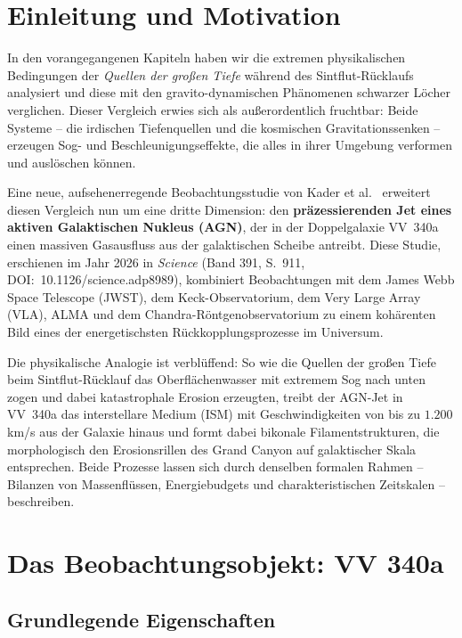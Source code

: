 ﻿\documentclass[12pt,a4paper]{report}
\begin{document}
\section{Einleitung und Motivation}

In den vorangegangenen Kapiteln haben wir die extremen physikalischen Bedingungen der \textit{Quellen der großen Tiefe} während des Sintflut-Rücklaufs analysiert und diese mit den gravito-dynamischen Phänomenen schwarzer Löcher verglichen. Dieser Vergleich erwies sich als außerordentlich fruchtbar: Beide Systeme -- die irdischen Tiefenquellen und die kosmischen Gravitationssenken -- erzeugen Sog- und Beschleunigungseffekte, die alles in ihrer Umgebung verformen und auslöschen können.

Eine neue, aufsehenerregende Beobachtungsstudie von Kader et al.\ \cite{kader2026} erweitert diesen Vergleich nun um eine dritte Dimension: den \textbf{präzessierenden Jet eines aktiven Galaktischen Nukleus (AGN)}, der in der Doppelgalaxie VV~340a einen massiven Gasausfluss aus der galaktischen Scheibe antreibt. Diese Studie, erschienen im Jahr 2026 in \textit{Science} (Band 391, S.\ 911, DOI:~10.1126/science.adp8989), kombiniert Beobachtungen mit dem James Webb Space Telescope (JWST), dem Keck-Observatorium, dem Very Large Array (VLA), ALMA und dem Chandra-Röntgenobservatorium zu einem kohärenten Bild eines der energetischsten Rückkopplungsprozesse im Universum.

Die physikalische Analogie ist verblüffend: So wie die Quellen der großen Tiefe beim Sintflut-Rücklauf das Oberflächenwasser mit extremem Sog nach unten zogen und dabei katastrophale Erosion erzeugten, treibt der AGN-Jet in VV~340a das interstellare Medium (ISM) mit Geschwindigkeiten von bis zu $1.200$\,km/s aus der Galaxie hinaus und formt dabei bikonale Filamentstrukturen, die morphologisch den Erosionsrillen des Grand Canyon auf galaktischer Skala entsprechen. Beide Prozesse lassen sich durch denselben formalen Rahmen -- Bilanzen von Massenflüssen, Energiebudgets und charakteristischen Zeitskalen -- beschreiben.

\section{Das Beobachtungsobjekt: VV 340a}

\subsection{Grundlegende Eigenschaften}
\end{document}
